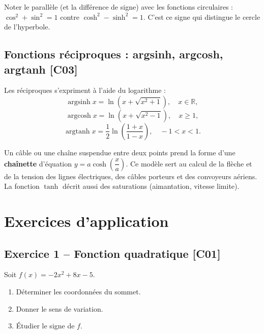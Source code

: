 \documentclass[a4paper,11pt]{article}
\begin{document}
\begin{remarque}
Noter le parallèle (et la différence de signe) avec les fonctions circulaires : $\cos^2 + \sin^2 = 1$ contre $\cosh^2 - \sinh^2 = 1$. C'est ce signe qui distingue le cercle de l'hyperbole.
\end{remarque}

\subsection{Fonctions réciproques : argsinh, argcosh, argtanh \hfill {\normalsize\color{uimmred}[C03]}}

\begin{theoreme}
Les réciproques s'expriment à l'aide du logarithme :
\[
\operatorname{argsinh} x = \ln\!\left(x + \sqrt{x^2 + 1}\right), \quad x \in \mathbb{R},
\]
\[
\operatorname{argcosh} x = \ln\!\left(x + \sqrt{x^2 - 1}\right), \quad x \geq 1,
\]
\[
\operatorname{argtanh} x = \frac{1}{2}\ln\!\left(\frac{1 + x}{1 - x}\right), \quad -1 < x < 1.
\]
\end{theoreme}

\begin{appliindus}
Un câble ou une chaîne suspendue entre deux points prend la forme d'une \textbf{chaînette} d'équation $y = a\cosh\!\left(\dfrac{x}{a}\right)$. Ce modèle sert au calcul de la flèche et de la tension des lignes électriques, des câbles porteurs et des convoyeurs aériens. La fonction $\tanh$ décrit aussi des saturations (aimantation, vitesse limite).
\end{appliindus}

\newpage
\section{Exercices d'application}

\subsection*{Exercice 1 -- Fonction quadratique \hfill {\normalsize\color{uimmred}[C01]}}
Soit $f(x) = -2x^2 + 8x - 5$.
\begin{enumerate}[label=\alph*)]
  \item Déterminer les coordonnées du sommet.
  \item Donner le sens de variation.
  \item Étudier le signe de $f$.
\end{enumerate}
\end{document}

